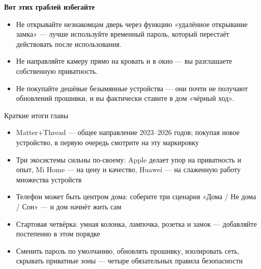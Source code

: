 \textbf{Вот этих граблей избегайте}\par

\begin{itemize}
  \item Не открывайте незнакомцам дверь через функцию «удалённое открывание замка» — лучше используйте временный пароль, который перестаёт действовать после использования.
  \item Не направляйте камеру прямо на кровать и в окно — вы разглашаете собственную приватность.
  \item Не покупайте дешёвые безымянные устройства — они почти не получают обновлений прошивки, и вы фактически ставите в дом «чёрный ход».
\end{itemize}

\begin{tcbsummary}{Краткие итоги главы}
\begin{itemize}
  \item Matter+Thread — общее направление 2023–2026 годов; покупая новое устройство, в первую очередь смотрите на эту маркировку
  \item Три экосистемы сильны по-своему: Apple делает упор на приватность и опыт, Mi Home — на цену и качество, Huawei — на слаженную работу множества устройств
  \item Телефон может быть центром дома: соберите три сценария «Дома / Не дома / Сон» — и дом начнёт жить сам
  \item Стартовая четвёрка: умная колонка, лампочка, розетка и замок — добавляйте постепенно в этом порядке
  \item Сменить пароль по умолчанию, обновлять прошивку, изолировать сеть, скрывать приватные зоны — четыре обязательных правила безопасности
\end{itemize}

\end{tcbsummary}
